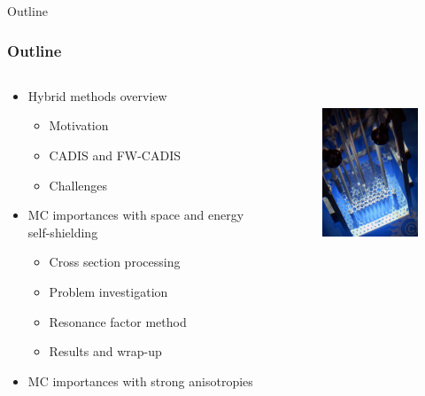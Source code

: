 \documentclass[xcolor=x11names,compress, handout]{beamer}
\renewcommand{\(}{\begin{columns}}
\renewcommand{\)}{\end{columns}}
\newcommand{\<}[1]{\begin{column}{#1}}
\renewcommand{\>}{\end{column}}
\begin{document}
\begin{frame}[fragile]{Outline}
  \frametitle{Outline}

\begin{columns}
  \begin{column}{0.6\textwidth}
    \begin{itemize}
    \item Hybrid methods overview
    \begin{itemize}
    		\item Motivation
		\item CADIS and FW-CADIS
		\item Challenges
    \end{itemize}
    	\item MC importances with space and energy self-shielding
	\begin{itemize}
    		\item Cross section processing
		\item Problem investigation
		\item Resonance factor method
		\item Results and wrap-up
  	\end{itemize}
	\item MC importances with strong anisotropies
  \end{itemize}
  \end{column}
  \begin{column}{0.4\textwidth}
  	\begin{figure}
  	\begin{center}
  		\includegraphics[height=2in,clip]{../figs/psu-reactor}
	\end{center}
  	\end{figure}
  \end{column}
\end{columns}

\end{frame}
\end{document}
